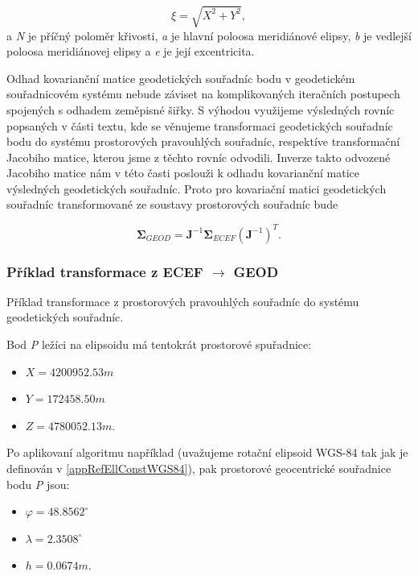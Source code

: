 \begin{equation}
\xi = \sqrt{X^{2} + Y^{2}}, 
\end{equation}
a \textit{N} je příčný poloměr křivosti, \textit{a} je hlavní poloosa meridiánové elipsy, \textit{b} je vedlejší poloosa meridiánovej elipsy a \textit{e} je její excentricita.

Odhad kovarianční matice geodetických souřadníc bodu v geodetickém souřadnicovém systému nebude záviset na komplikovaných iteračních postupech spojených s odhadem zeměpisné šiřky. S výhodou využijeme výsledných rovníc popsaných v části textu, kde se věnujeme transformaci geodetických souřadníc bodu do systému prostorových pravouhlých souřadníc, respektíve transformační Jacobiho matice, kterou jsme z těchto rovníc odvodili. Inverze takto odvozené Jacobiho matice nám v této časti poslouži k odhadu kovarianční matice výsledných geodetických souřadníc. Proto pro kovariační matici geodetických souřadníc transformované ze soustavy prostorových souřadníc bude

\begin{equation}
\mathbf{\Sigma}_{GEOD} = \mathbf{J}^{-1}\mathbf{\Sigma}_{ECEF}\left(\mathbf{J}^{-1}\right)^{T}.
\end{equation}

\subsubsection{Příklad transformace z ECEF $\rightarrow$ GEOD}

Příklad transformace z prostorových pravouhlých souřadníc do systému geodetických souřadníc.

Bod \textit{P} ležíci na elipsoidu má tentokrát prostorové  spuřadnice:
\begin{itemize}
\item $X = 4200952.53 m$
\item $Y = 172458.50 m$
\item $Z = 4780052.13 m.$
\end{itemize}

Po aplikovaní algoritmu například \cite{Vermeille2011} (uvažujeme rotační elipsoid WGS-84 tak jak je definován v \ref{appRefEllConstWGS84}), pak prostorové geocentrické souřadnice bodu \textit{P} jsou:
\begin{itemize}
\item $\varphi = 48.8562^{\circ}$
\item $\lambda = 2.3508^{\circ}$
\item $h = 0.0674 m.$
\end{itemize}


